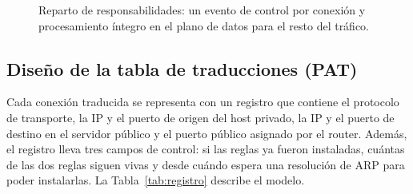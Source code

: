 ﻿\documentclass[10pt,a4paper]{article}
\begin{document}
\begin{figure}[H]
\centering
{}
\caption{Reparto de responsabilidades: un evento de control por conexión y
procesamiento íntegro en el plano de datos para el resto del tráfico.}
\label{fig:flujo}
\end{figure}

\subsection{Diseño de la tabla de traducciones (PAT)}

Cada conexión traducida se representa con un registro que contiene el protocolo de
transporte, la IP y el puerto de origen del host privado, la IP y el puerto de
destino en el servidor público y el puerto público asignado por el router. Además,
el registro lleva tres campos de control: si las reglas ya fueron instaladas, cuántas
de las dos reglas siguen vivas y desde cuándo espera una resolución de ARP para poder
instalarlas. La Tabla~\ref{tab:registro} describe el modelo.
\end{document}
